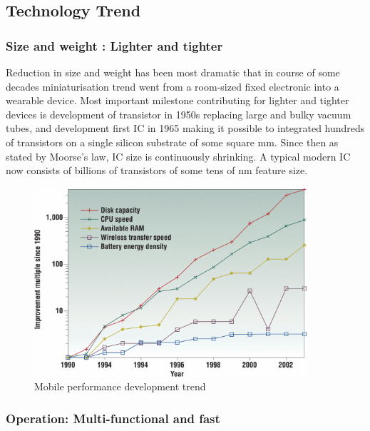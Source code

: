 \documentclass[12pt,a4paper,UKenglish]{article}
\begin{document}
\subsection{Technology Trend}

\subsubsection{Size and weight : Lighter and tighter}

Reduction in size and weight has been most dramatic that in course of some decades miniaturisation trend went 
from a room-sized fixed electronic into a wearable device. Most important milestone contributing for lighter and 
tighter devices is development of transistor in 1950s replacing large and bulky vacuum tubes, and  
development first IC in 1965 making it possible to integrated hundreds of transistors on a single silicon substrate of 
some square mm. Since then as stated by Moorse's law, IC size is continuously shrinking. A typical modern IC now 
consists of billions of transistors of some  tens of nm feature size. \\

\begin{figure}[!htbp] %
   \centering
   \includegraphics[width=0.9\textwidth]{img/comp_tech_batt.png}
   \caption{Mobile performance development trend \cite{mobile_performance}}
   \label{fig:comp_tech_batt}
\end{figure}

\subsubsection{Operation: Multi-functional and fast}
\end{document}

